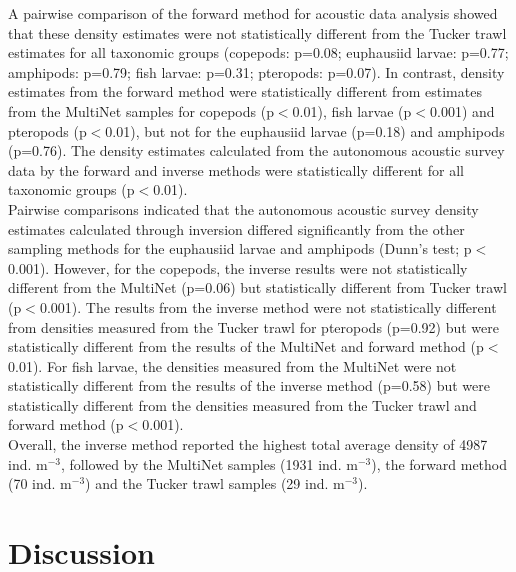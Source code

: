 A pairwise comparison of the forward method for acoustic data analysis showed that these density estimates were not statistically different from the Tucker trawl estimates for all taxonomic groups (copepods: p=0.08; euphausiid larvae: p=0.77; amphipods: p=0.79; fish larvae: p=0.31; pteropods: p=0.07). In contrast, density estimates from the forward method were statistically different from estimates from the MultiNet samples for copepods (p$<$0.01), fish larvae (p$<$0.001) and pteropods (p$<$0.01), but not for the euphausiid larvae (p=0.18) and amphipods (p=0.76). The density estimates calculated from the autonomous acoustic survey data by the forward and inverse methods were statistically different for all taxonomic groups (p$<$0.01).\\
Pairwise comparisons indicated that the autonomous acoustic survey density estimates calculated through inversion differed significantly from the other sampling methods for the euphausiid larvae and amphipods (Dunn's test; p$<$0.001). However, for the copepods, the inverse results were not statistically different from the MultiNet (p=0.06) but statistically different from Tucker trawl (p$<$0.001). The results from the inverse method were not statistically different from densities measured from the Tucker trawl for pteropods (p=0.92) but were statistically different from the results of the MultiNet and forward method (p$<$0.01). For fish larvae, the densities measured from the MultiNet were not statistically different from the results of the inverse method (p=0.58) but were statistically different from the densities measured from the Tucker trawl and forward method (p$<$0.001).\\
Overall, the inverse method reported the highest total average density of 4987 ind. m$^{-3}$, followed by the MultiNet samples (1931 ind. m$^{-3}$), the forward method (70 ind. m$^{-3}$) and the Tucker trawl samples (29 ind. m$^{-3}$).

\section{Discussion} 

